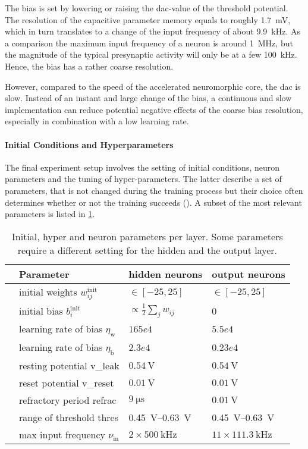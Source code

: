 The bias is set by lowering or raising the \gls{dac}-value of the threshold potential. The resolution of the capacitive parameter memory equals to roughly \SI{1.7}{\milli \V}, which in turn translates to a change of the input frequency of about \SI{9.9}{\kilo \Hz}. As a comparison the maximum input frequency of a neuron is around \SI{1}{\mega \Hz}, but the magnitude of the typical presynaptic activity will only be at a few \SI{100}{\kilo \Hz}. Hence, the bias has a rather coarse resolution.

However, compared to the speed of the accelerated neuromorphic core, the \acrlong{dac} is slow. Instead of an instant and large change of the bias, a continuous and slow implementation can reduce potential negative effects of the coarse bias resolution, especially in combination with a low learning rate.

\paragraph{Initial Conditions and Hyperparameters}
The final experiment setup involves the setting of initial conditions, neuron parameters and the tuning of hyper-parameters. The latter describe a set of parameters, that is not changed during the training process but their choice often determines whether or not the training succeeds (\citealp{Goodfellow-et-al-2016}). A subset of the most relevant parameters is listed in \cref{circlesinitparameters}.

\begin{table}[t!]\centering{}
	\begin{tabular}{@{}rlll@{}}\toprule
		& Parameter								& 	hidden neurons 			& 	output neurons 	\\ \midrule
		& initial weights $w_{ij}^\text{init}$	& 	 $\in[-25, 25]$			&	$\in[-25, 25]$	\\
		& initial bias $b_{i}^\text{init}$		& $\propto \frac{1}{2} \sum_j w_{ij}$ &	0		\\
		& learning rate of bias  $\eta_\text{w}$&	$165e4$					& 	$5.5e4$			\\
		& learning rate of bias  $\eta_\text{b}$&	$2.3e4$					& 	$0.23e4$		\\
		& resting potential \gls{v_leak}		&	$\SI{0.54}{\V}$ 		& 	$\SI{0.54}{\V}$	\\
		& reset potential \gls{v_reset}			&	$\SI{0.01}{\V}$			& 	$\SI{0.01}{\V}$	\\
		& refractory period \gls{refrac}		&	$\SI{9}{\micro \s}$			& 	$\SI{0.01}{\V}$	\\
		& range of threshold \gls{thres} 				&	\SIrange{0.45}{0.63}{\V}&	\SIrange{0.45}{0.63}{\V}\\
		& max input frequency $\nu_{\text{in}}$	&	$2 \times \SI{500}{\kilo \Hz}$	& $11 \times \SI{111.3}{\kilo\Hz}$	\\
		\bottomrule
	\end{tabular}
	\caption[Initial, hyper and neuron parameters per layer.]{Initial, hyper and neuron parameters per layer. Some parameters require a different setting for the hidden and the output layer.}
	\label{circlesinitparameters}
\end{table}

